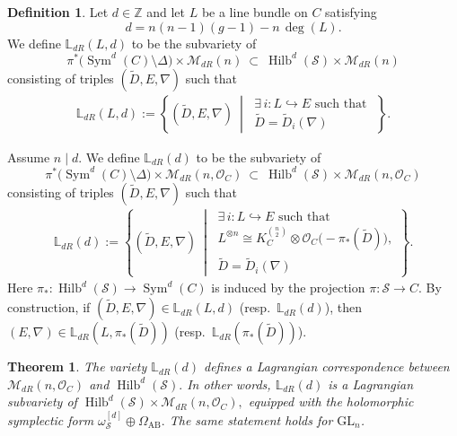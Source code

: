 \documentclass[twoside, 11pt]{article}
\numberwithin{equation}{section}
\theoremstyle{theorem}
\newtheorem{theorem}{Theorem}
\numberwithin{theorem}{section}
\theoremstyle{definition}
\newtheorem{definition}[definition]{Definition}
\begin{document}
\begin{definition}\label{def:lag-on-extended-space-dR-alt}
Let $d \in \mathbb{Z}$ and let $L$ be a line bundle on $C$ satisfying
\[
d = n(n-1)(g-1) - n\,\deg(L).
\]
We define $\mathbb{L}_{dR}(L,d)$ to be the subvariety of
\[
\pi^\ast\bigl(\operatorname{Sym}^d(C)\setminus \Delta\bigr)\times \mathcal{M}_{dR}(n)
\ \subset\
\operatorname{Hilb}^d(\mathcal{S})\times \mathcal{M}_{dR}(n)
\]
consisting of triples $(\widetilde{D},E,\nabla)$ such that
\begin{align}
\mathbb{L}_{dR}(L,d)
:=
\left\{
    (\widetilde{D}, E, \nabla)\ \middle|\ 
    \begin{array}{l}
        \exists\, i: L \hookrightarrow E \text{ such that } \\[2pt]
        \widetilde{D}=\widetilde{D}_i(\nabla)
    \end{array}
\right\}.
\end{align}


Assume $n\mid d$. We define $\mathbb{L}_{dR}(d)$ to be the subvariety of
\[
\pi^\ast\bigl(\operatorname{Sym}^d(C)\setminus \Delta\bigr)\times \mathcal{M}_{dR}(n, \mathcal{O}_C)
\ \subset\
\operatorname{Hilb}^d(\mathcal{S})\times \mathcal{M}_{dR}(n, \mathcal{O}_C)
\]
consisting of triples $(\widetilde{D},E,\nabla)$ such that
\begin{align}
\mathbb{L}_{dR}(d)
:=
\left\{
    (\widetilde{D}, E, \nabla)\ \middle|\ 
    \begin{array}{l}
        \exists\, i:L \hookrightarrow E \text{ such that } \\[2pt]
        L^{\otimes n} \cong K_C^{\binom{n}{2}}\otimes \mathcal{O}_C\!\bigl(-\pi_\ast(\widetilde{D})\bigr), \\[2pt]
        \widetilde{D}=\widetilde{D}_i(\nabla)
    \end{array}
\right\}.
\end{align}
Here $\pi_\ast:\operatorname{Hilb}^d(\mathcal{S})\to \operatorname{Sym}^d(C)$ is induced by the projection $\pi:\mathcal{S}\to C$.
\medskip
By construction, if $(\widetilde{D},E,\nabla)\in \mathbb{L}_{dR}(L,d)$ (resp.\ $\mathbb{L}_{dR}(d)$), then
$(E,\nabla)\in \mathbb{L}_{dR}(L,\pi_\ast(\widetilde{D}))$ (resp.\ $\mathbb{L}_{dR}(\pi_\ast(\widetilde{D}))$).
\end{definition}


\begin{theorem}\label{thm: Lag corres dR; SLn}
The variety $\mathbb{L}_{dR}(d)$ defines a \emph{Lagrangian correspondence} between
\(
\mathcal{M}_{dR}(n, \mathcal{O}_C)
\)
and
\(
\operatorname{Hilb}^d(\mathcal{S}).
\)
In other words, $\mathbb{L}_{dR}(d)$ is a Lagrangian subvariety of
\(
\operatorname{Hilb}^d(\mathcal{S})\times \mathcal{M}_{dR}(n, \mathcal{O}_C),
\)
equipped with the holomorphic symplectic form
\(
\omega_{\mathcal{S}}^{[d]}\oplus \Omega_{\mathrm{AB}}.
\)
The same statement holds for $\mathrm{GL}_n$.
\end{theorem}
\end{document}
